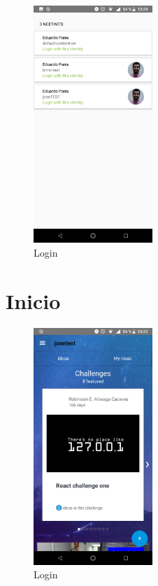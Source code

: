 \begin{figure}[!h]
	\begin{center}
		\includegraphics[width=0.4\textwidth]{./img/anexo1/seleccion_empresa.png}
		\caption{Login}
		\label{fig:seleccion_empresa}
	\end{center}
\end{figure}

\section{Inicio}

\begin{figure}[!h]
	\begin{center}
		\includegraphics[width=0.4\textwidth]{./img/anexo1/inicio.png}
		\caption{Login}
		\label{fig:inicio}
	\end{center}
\end{figure}

